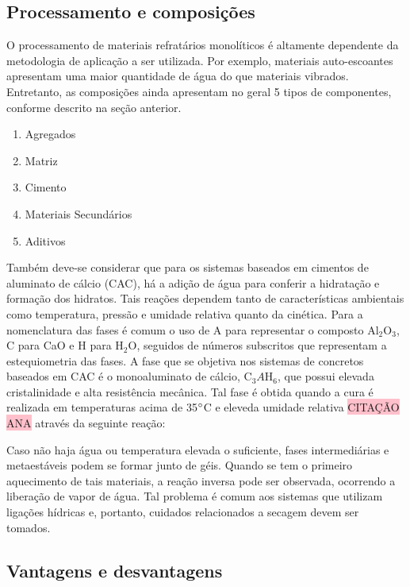     \subsection{Processamento e composições}
      O processamento de materiais refratários monolíticos é altamente dependente da metodologia de aplicação a ser utilizada. Por exemplo, materiais auto-escoantes apresentam uma maior quantidade de água do que materiais vibrados. Entretanto, as composições ainda apresentam no geral 5 tipos de componentes, conforme descrito na seção anterior.

\begin{enumerate}
\item Agregados
\item Matriz
\item Cimento
\item Materiais Secundários
\item Aditivos
\end{enumerate}

	Também deve-se considerar que para os sistemas baseados em cimentos de aluminato de cálcio (CAC), há a adição de água para conferir a hidratação e formação dos hidratos. Tais reações dependem tanto de características ambientais como temperatura, pressão e umidade relativa quanto da cinética.
    Para a nomenclatura das fases é comum o uso de A para representar o composto Al$_2$O$_3$, C para CaO e H para H$_2$O, seguidos de números subscritos que representam a estequiometria das fases.
    A fase que se objetiva nos sistemas de concretos baseados em CAC é o monoaluminato de cálcio, C$_3A$H${_6}$, que possui elevada cristalinidade e alta resistência mecânica. Tal fase é obtida quando a cura é realizada em temperaturas acima de 35$\degree $C e eleveda umidade relativa \colorbox{pink}{CITAÇÃO ANA} através da seguinte reação:


	Caso não haja água ou temperatura elevada o suficiente, fases intermediárias e metaestáveis podem se formar junto de géis. Quando se tem o primeiro aquecimento de tais materiais, a reação inversa pode ser observada, ocorrendo a liberação de vapor de água. Tal problema é comum aos sistemas que utilizam ligações hídricas e, portanto, cuidados relacionados a secagem devem ser tomados.

    \subsection{Vantagens e desvantagens}
      
